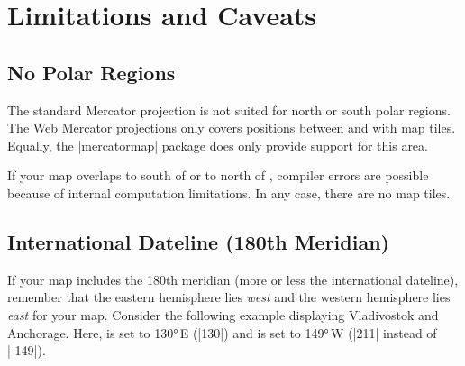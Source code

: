 \clearpage
\section{Limitations and Caveats}%

\subsection{No Polar Regions}
  The standard Mercator projection is not suited for north or south polar
  regions.
  The Web Mercator projections only covers
  positions between  and 
  with map tiles. Equally, the |mercatormap| package does only provide support for
  this area.

  If your map overlaps to south of  or to north of  ,
  compiler errors are possible because of internal computation limitations.
  In any case, there are no map tiles.

  \begin{dispExample}
  \end{dispExample}

\clearpage
\subsection{International Dateline (180th Meridian)}\label{sec:dateline}
  If your map includes the 180th meridian (more or less the international dateline),
  remember that the eastern hemisphere lies \emph{west} and
  the western hemisphere lies \emph{east} for your map.
  Consider the following example displaying Vladivostok and Anchorage.
  Here,  is set to \ang{130}\,E (|130|)
  and  is set to \ang{149}\,W (|211| instead of |-149|).

